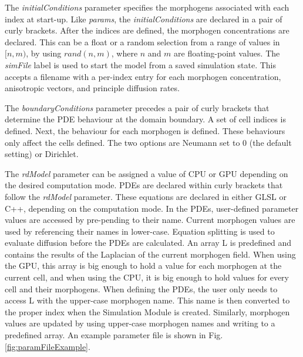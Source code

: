 The \textit{initialConditions} parameter specifies the morphogens associated with each index at start-up. Like \textit{params}, the \textit{initialConditions} are declared in a pair of curly brackets. After the indices are defined, the morphogen concentrations are declared. This can be a float or a random selection from a range of values in $[n, m)$, by using $rand(n, m)$, where $n$ and $m$ are floating-point values. The \textit{simFile} label is used to start the model from a saved simulation state. This accepts a filename with a per-index entry for each morphogen concentration, anisotropic vectors, and principle diffusion rates.

The \textit{boundaryConditions} parameter precedes a pair of curly brackets that determine the PDE behaviour at the domain boundary. A set of cell indices is defined. Next, the behaviour for each morphogen is defined. These behaviours only affect the cells defined. The two options are Neumann set to 0 (the default setting) or Dirichlet. 

The \textit{rdModel} parameter can be assigned a value of CPU or GPU depending on the desired computation mode. PDEs are declared within curly brackets that follow the \textit{rdModel} parameter. These equations are declared in either GLSL or C++, depending on the computation mode. In the PDEs, user-defined parameter values are accessed by pre-pending  to their name. Current morphogen values are used by referencing their names in lower-case. Equation splitting is used to evaluate diffusion before the PDEs are calculated. An array L is predefined and contains the results of the Laplacian of the current morphogen field. When using the GPU, this array is big enough to hold a value for each morphogen at the current cell, and when using the CPU, it is big enough to hold values for every cell and their morphogens. When defining the PDEs, the user only needs to access L with the upper-case morphogen name. This name is then converted to the proper index when the Simulation Module is created. Similarly, morphogen values are updated by using upper-case morphogen names and writing to a predefined  array. An example parameter file is shown in Fig. \ref{fig:paramFileExample}.

